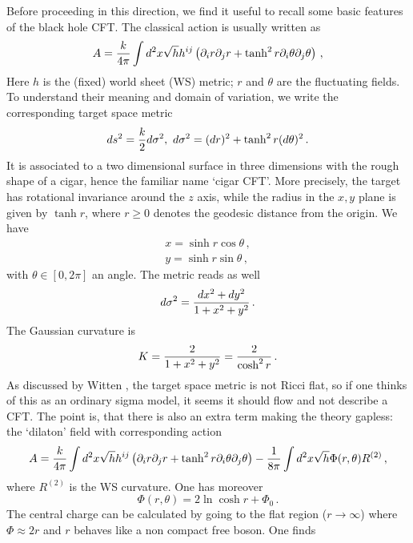 \documentclass[11pt]{article}
\begin{document}
Before proceeding in this direction, we find it   useful  to recall some basic features of the black hole CFT. 
The classical action is usually written as
%
\begin{equation}
 A={k\over 4\pi}\int d^2x \sqrt{h}h^{ij}\left(\partial_i r\partial_j r+\tanh^2 r\partial_i\theta\partial_j\theta\right) \,,
\end{equation}
%
Here $h$ is the (fixed) world sheet (WS) metric; $r$ and $\theta$ are the fluctuating fields. To understand their meaning and domain of variation, we write the corresponding target space metric 
%
\begin{equation}
 ds^2={k\over 2} d\sigma^2,~d\sigma^2=(dr)^2+\tanh^2r (d\theta)^2 \,.
\end{equation}
It is associated  to a two dimensional surface in three dimensions with the rough shape of a cigar, hence the familiar name `cigar CFT'. More precisely, the target has rotational invariance around the $z$ axis, while the radius in the $x,y$ plane is given by $\tanh r$, where $r\geq 0$ denotes the geodesic distance from the origin. We have
%
\begin{eqnarray}
 x=\sinh r\cos\theta \,, \nonumber\\
 y=\sinh r\sin\theta \,,
\end{eqnarray}
%
with $\theta\in [0,2\pi]$ an angle. The metric reads as well
%
\begin{equation}
 d\sigma^2={dx^2+dy^2\over 1+x^2+y^2} \,.
\end{equation}
%
The Gaussian curvature is 
%
\begin{equation}
 K={2\over 1+x^2+y^2}={2\over\cosh^2 r} \,.
\end{equation}
%
As discussed by Witten \cite{BlackHoleCFT}, the target space metric is not Ricci flat, so if one thinks of this as an ordinary sigma model, it seems it should flow and not describe a CFT. The point is, that  there is also an extra term making the theory gapless: the `dilaton' field with corresponding action
\begin{equation}
 A={k\over 4\pi}\int d^2x \sqrt{h}h^{ij}\left(\partial_i r\partial_j r+\tanh^2 r\partial_i\theta\partial_j\theta\right)-{1\over 8\pi}\int d^2x \sqrt{h}\Phi(r,\theta)R^{(2)} \,,
\end{equation}
%
where $R^{(2)}$ is the WS curvature. One has moreover
%
\begin{equation}
 \Phi(r,\theta)=2\ln\cosh r+\Phi_0 \,.
 \label{dilaton}
\end{equation}
%
The central charge can be calculated by going to the flat region ($r\to\infty$) where $\Phi\approx 2r$ and $r$ behaves like a non compact free boson. One finds 
\end{document}

